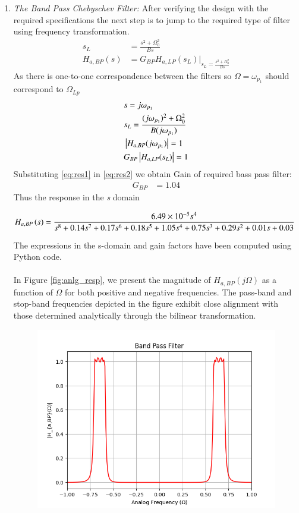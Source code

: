 \documentclass[journal,12pt,twocolumn]{IEEEtran}
\theoremstyle{remark}
\begin{document}
\begin{enumerate}
\item \textit{The Band Pass Chebyschev Filter:} 
After verifying the design with the required specifications the next step is to jump to the required type of filter using frequency transformation. 
\begin{align}
    s_L &= \frac{s^2 + \Omega_0^2}{Bs} \\
    H_{a,BP}(s) &= G_{BP}H_{a,LP}(s_L)\vert_{s_L = \frac{s^2 + \Omega_0^2}{Bs}}
\end{align}
As there is one-to-one correspondence between the filters so $\Omega=\omega_{p_1}$ should correspond to $\Omega_{Lp}$
\begin{align}
    &s = j\omega_{p_1}\\
    &s_{L} = \frac{(j\omega_{p_1})^2 + \Omega_0^2}{B(j\omega_{p_1})} \label{eq:res1} \\ 
    &\left\vert H_{a,BP}(j\omega_{p_1})\right\vert = 1 \\
    &G_{BP}\left\vert H_{a,LP}(s_L)\right\vert = 1 \label{eq:res2}
\end{align}
Substituting \eqref{eq:res1} in \eqref{eq:res2} we obtain Gain of required bass pass filter:
\begin{align}
    G_{BP} &= 1.04 
\end{align}
Thus the response in the \textit{s} domain 
\begin{tiny}
\begin{align}
    H_{a,BP}\left(s\right) &= \dfrac{6.49\times 10^{-5}s^4}{s^8 + 0.14s^7 + 0.17s^6 + 0.18s^5 + 1.05s^4 + 0.75s^3 + 0.29s^2 + 0.01s + 0.03}  \label{eq:magnitude_bandpass_analog}
\end{align}
\end{tiny}
The expressions in the s-domain and gain factors have been computed using Python code.\\ \\ In Figure \ref{fig:anlg_resp}, we present the magnitude of \( H_{a, BP}(j\Omega) \) as a function of \( \Omega \) for both positive and negative frequencies. The pass-band and stop-band frequencies depicted in the figure exhibit close alignment with those determined analytically through the bilinear transformation. 
\begin{figure}[h]
    \centering
    \includegraphics[width = \columnwidth]{figs/Band_Pass_Filter.png}

\end{figure}
\end{enumerate}
\end{document}
